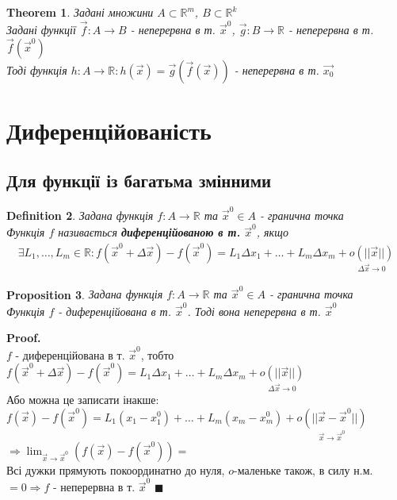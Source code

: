 \documentclass[a4paper, 14pt]{extarticle}
\def\huge{\displaystyle}
\theoremstyle{theoremdd}
\newtheorem{theorem}{Theorem}[subsection]
\theoremstyle{theoremdd}
\newtheorem{definition}[theorem]{Definition}
\theoremstyle{theoremdd}
\newtheorem{proposition}[theorem]{Proposition}
\theoremstyle{theoremdd}
\theoremstyle{theoremdd}
\theoremstyle{theoremdd}
\theoremstyle{theoremdd}
\newenvironment{pf}{\vspace*{-3mm} \textbf{Proof. \\}}{$\blacksquare$}
\begin{document}
\begin{theorem}
Задані множини $A \subset \mathbb{R}^m$, $B \subset \mathbb{R}^k$\\
Задані функції $\vec{f}: A \to B$ - неперервна в т. $\vec{x}^0$, $\vec{g}: B \to \mathbb{R}$ - неперервна в т. $\vec{f}(\vec{x}^0)$\\
Тоді функція $h: A \to \mathbb{R}: h(\vec{x}) = \vec{g}(\vec{f}(\vec{x}))$ - неперервна в т. $\vec{x_0}$
\end{theorem}
\newpage

\section{Диференційованість}
\subsection{Для функції із багатьма змінними}
\begin{definition}
Задана функція $f: A \to \mathbb{R}$ та $\vec{x}^0 \in A$ - гранична точка\\
Функція $f$ називається \textbf{диференційованою в т.} $\vec{x}^0$, якщо
\begin{align*}
\exists L_1,\dots, L_m \in \mathbb{R}: f(\vec{x}^0 + \Delta \vec{x}) - f(\vec{x}^0) = L_1 \Delta x_1 + \dots + L_m \Delta x_m + \underset{\Delta \vec{x} \to 0}{o(||\vec{x}||)}
\end{align*}
\end{definition}

\begin{proposition}
Задана функція $f: A \to \mathbb{R}$ та $\vec{x}^0 \in A$ - гранична точка\\
Функція $f$ - диференційована в т. $\vec{x}^0$. Тоді вона неперервна в т. $\vec{x}^0$
\end{proposition}
\begin{pf}
$f$ - диференційована в т. $\vec{x}^0$, тобто\\
$f(\vec{x}^0 + \Delta \vec{x}) - f(\vec{x}^0) = L_1 \Delta x_1 + \dots + L_m \Delta x_m + \underset{\Delta \vec{x} \to 0}{o(||\vec{x}||)}$\\
Або можна це записати інакше:\\
$f(\vec{x}) - f(\vec{x}^0) = L_1(x_1 - x_1^0) + \dots + L_m(x_m - x_m^0) + \underset{\vec{x} \to \vec{x}^0}{o(||\vec{x}-\vec{x}^0||)}$\\
$\Rightarrow \huge \lim_{\vec{x} \to \vec{x}^0} (f(\vec{x}) - f(\vec{x}^0)) \boxed{=}$\\
Всі дужки прямують покоординатно до нуля, $o$-маленьке також, в силу н.м. \\
$\boxed{=} 0 \Rightarrow f$ - неперервна в т. $\vec{x}^0$
\end{pf}
\end{document}
